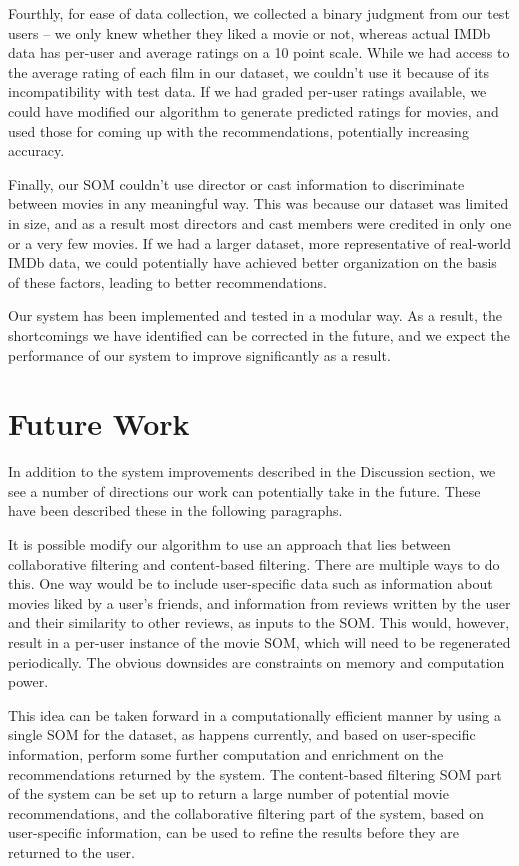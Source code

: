 \documentclass[conference]{IEEEtran}
\begin{document}
Fourthly, for ease of data collection, we collected a binary judgment from our test users – we only knew whether they liked a movie or not, whereas actual IMDb data has per-user and average ratings on a 10 point scale. While we had access to the average rating of each film in our dataset, we couldn't use it because of its incompatibility with test data. If we had graded per-user ratings available, we could have modified our algorithm to generate predicted ratings for movies, and used those for coming up with the recommendations, potentially increasing accuracy.

Finally, our SOM couldn't use director or cast information to discriminate between movies in any meaningful way. This was because our dataset was limited in size, and as a result most directors and cast members were credited in only one or a very few movies. If we had a larger dataset, more representative of real-world IMDb data, we could potentially have achieved better organization on the basis of these factors, leading to better recommendations.

Our system has been implemented and tested in a modular way. As a result, the shortcomings we have identified can be corrected in the future, and we expect the performance of our system to improve significantly as a result.

\section{Future Work}
In addition to the system improvements described in the Discussion section, we see a number of directions our work can potentially take in the future. These have been described these in the following paragraphs.

It is possible modify our algorithm to use an approach that lies between collaborative filtering and content-based filtering. There are multiple ways to do this. One way would be to include user-specific data such as information about movies liked by a user's friends, and information from reviews written by the user and their similarity to other reviews, as inputs to the SOM. This would, however, result in a per-user instance of the movie SOM, which will need to be regenerated periodically. The obvious downsides are constraints on memory and computation power.

This idea can be taken forward in a computationally efficient manner by using a single SOM for the dataset, as happens currently, and based on user-specific information, perform some further computation and enrichment on the recommendations returned by the system. The content-based filtering SOM part of the system can be set up to return a large number of potential movie recommendations, and the collaborative filtering part of the system, based on user-specific information, can be used to refine the results before they are returned to the user.
\end{document}
